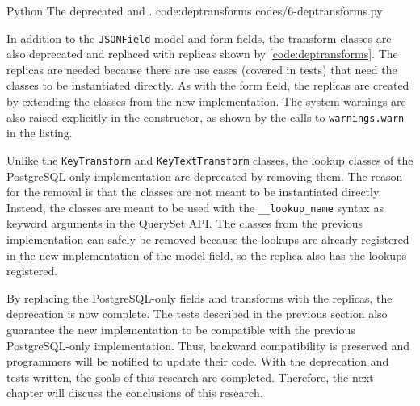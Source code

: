 \listing
{Python}
{The deprecated  and .}
{code:deptransforms}
{codes/6-deptransforms.py}

In addition to the \verb|JSONField| model and form fields, the transform
classes are also deprecated and replaced with replicas shown by
\autoref{code:deptransforms}. The replicas are needed because there are use
cases (covered in tests) that need the classes to be instantiated directly. As
with the form field, the replicas are created by extending the classes from the
new implementation. The system warnings are also raised explicitly in the
constructor, as shown by the calls to \verb|warnings.warn| in the listing.

Unlike the \verb|KeyTransform| and \verb|KeyTextTransform| classes, the lookup
classes of the PostgreSQL-only implementation are deprecated by removing them.
The reason for the removal is that the classes are not meant to be instantiated
directly. Instead, the classes are meant to be used with the
\verb|__lookup_name| syntax as keyword arguments in the QuerySet API. The
classes from the previous implementation can safely be removed because the
lookups are already registered in the new implementation of the model field, so
the replica also has the lookups registered.

By replacing the PostgreSQL-only fields and transforms with the replicas, the
deprecation is now complete. The tests described in the previous section also
guarantee the new implementation to be compatible with the previous
PostgreSQL-only implementation. Thus, backward compatibility is preserved and
programmers will be notified to update their code. With the deprecation and
tests written, the goals of this research are completed. Therefore, the next
chapter will discuss the conclusions of this research.
